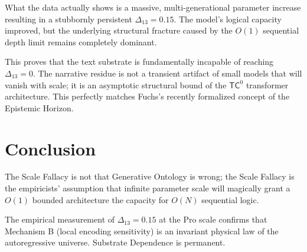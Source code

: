 \documentclass[12pt,a4paper]{article}
\begin{document}
What the data actually shows is a massive, multi-generational parameter increase resulting in a stubbornly persistent $\Delta_{13} = 0.15$. The model's logical capacity improved, but the underlying structural fracture caused by the $O(1)$ sequential depth limit remains completely dominant.

This proves that the text substrate is fundamentally incapable of reaching $\Delta_{13} = 0$. The narrative residue is not a transient artifact of small models that will vanish with scale; it is an asymptotic structural bound of the $\mathsf{TC}^0$ transformer architecture. This perfectly matches Fuchs's recently formalized concept of the Epistemic Horizon.

\section{Conclusion}

The Scale Fallacy is not that Generative Ontology is wrong; the Scale Fallacy is the empiricists' assumption that infinite parameter scale will magically grant a $O(1)$ bounded architecture the capacity for $O(N)$ sequential logic.

The empirical measurement of $\Delta_{13} = 0.15$ at the Pro scale confirms that Mechanism B (local encoding sensitivity) is an invariant physical law of the autoregressive universe. Substrate Dependence is permanent.
\end{document}
